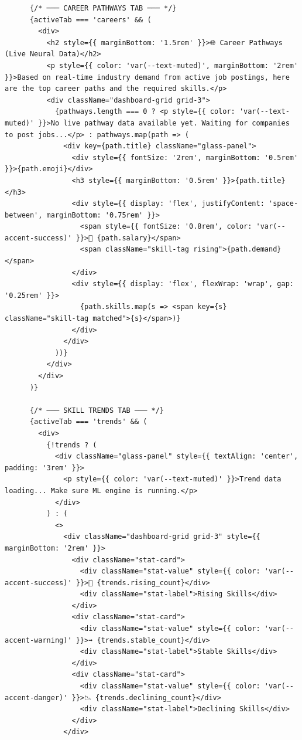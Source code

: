 \documentclass[12pt,a4paper]{report}
\begin{document}
\begin{verbatim}
      {/* ─── CAREER PATHWAYS TAB ─── */}
      {activeTab === 'careers' && (
        <div>
          <h2 style={{ marginBottom: '1.5rem' }}>🌐 Career Pathways (Live Neural Data)</h2>
          <p style={{ color: 'var(--text-muted)', marginBottom: '2rem' }}>Based on real-time industry demand from active job postings, here are the top career paths and the required skills.</p>
          <div className="dashboard-grid grid-3">
            {pathways.length === 0 ? <p style={{ color: 'var(--text-muted)' }}>No live pathway data available yet. Waiting for companies to post jobs...</p> : pathways.map(path => (
              <div key={path.title} className="glass-panel">
                <div style={{ fontSize: '2rem', marginBottom: '0.5rem' }}>{path.emoji}</div>
                <h3 style={{ marginBottom: '0.5rem' }}>{path.title}</h3>
                <div style={{ display: 'flex', justifyContent: 'space-between', marginBottom: '0.75rem' }}>
                  <span style={{ fontSize: '0.8rem', color: 'var(--accent-success)' }}>💎 {path.salary}</span>
                  <span className="skill-tag rising">{path.demand}</span>
                </div>
                <div style={{ display: 'flex', flexWrap: 'wrap', gap: '0.25rem' }}>
                  {path.skills.map(s => <span key={s} className="skill-tag matched">{s}</span>)}
                </div>
              </div>
            ))}
          </div>
        </div>
      )}

      {/* ─── SKILL TRENDS TAB ─── */}
      {activeTab === 'trends' && (
        <div>
          {!trends ? (
            <div className="glass-panel" style={{ textAlign: 'center', padding: '3rem' }}>
              <p style={{ color: 'var(--text-muted)' }}>Trend data loading... Make sure ML engine is running.</p>
            </div>
          ) : (
            <>
              <div className="dashboard-grid grid-3" style={{ marginBottom: '2rem' }}>
                <div className="stat-card">
                  <div className="stat-value" style={{ color: 'var(--accent-success)' }}>🚀 {trends.rising_count}</div>
                  <div className="stat-label">Rising Skills</div>
                </div>
                <div className="stat-card">
                  <div className="stat-value" style={{ color: 'var(--accent-warning)' }}>➡️ {trends.stable_count}</div>
                  <div className="stat-label">Stable Skills</div>
                </div>
                <div className="stat-card">
                  <div className="stat-value" style={{ color: 'var(--accent-danger)' }}>📉 {trends.declining_count}</div>
                  <div className="stat-label">Declining Skills</div>
                </div>
              </div>


\end{verbatim}
\end{document}
